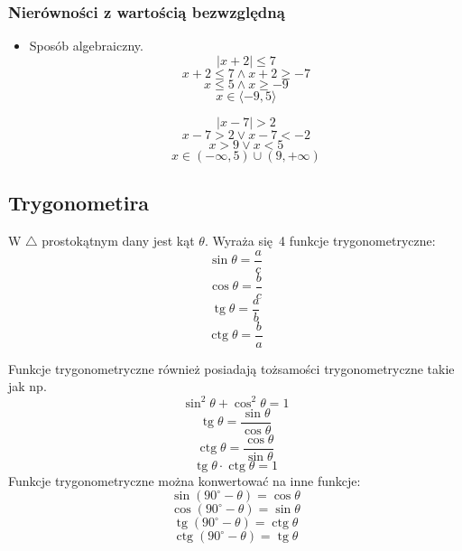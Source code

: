\documentclass[12pt, a4paper]{article}
\DeclareMathOperator{\tg}{tg}
\DeclareMathOperator{\ctg}{ctg}
\begin{document}
\subsubsection{Nierówności z wartością bezwzględną}
\begin{itemize}
  \item Sposób algebraiczny.
      $$\left| x+2 \right| \leq 7$$
      $$x+2 \leq 7 \wedge x+2\geq -7$$
      $$x \leq 5 \wedge x \geq -9$$
      $$x \in \langle -9,5 \rangle$$

      $$\left| x-7 \right| > 2$$
      $$x-7 > 2 \vee x-7 < -2$$
      $$x > 9 \vee x < 5$$
      $$x \in \left(-\infty, 5\right) \cup \left(9, +\infty \right)$$
\end{itemize}
\subsection{Trygonometira}
W $\triangle$ prostokątnym dany jest kąt $\theta$. Wyraża się 4 funkcje trygonometryczne:
$$\sin\theta=\frac{a}{c}$$
$$\cos\theta=\frac{b}{c}$$
$$\tg\theta=\frac{a}{b}$$
$$\ctg\theta=\frac{b}{a}$$
\begin{center}
\end{center}
Funkcje trygonometryczne również posiadają tożsamości trygonometryczne takie jak np.
$$\sin^2\theta+\cos^2\theta = 1$$
$$\tg\theta=\frac{\sin\theta}{\cos\theta}$$
$$\ctg\theta=\frac{\cos\theta}{\sin\theta}$$
$$\tg\theta\cdot\ctg\theta=1$$
Funkcje trygonometryczne można konwertować na inne funkcje:
$$\sin(90^{\circ}-\theta)=\cos\theta$$
$$\cos(90^{\circ}-\theta)=\sin\theta$$
$$\tg(90^{\circ}-\theta)=\ctg\theta$$
$$\ctg(90^{\circ}-\theta)=\tg\theta$$
\end{document}
